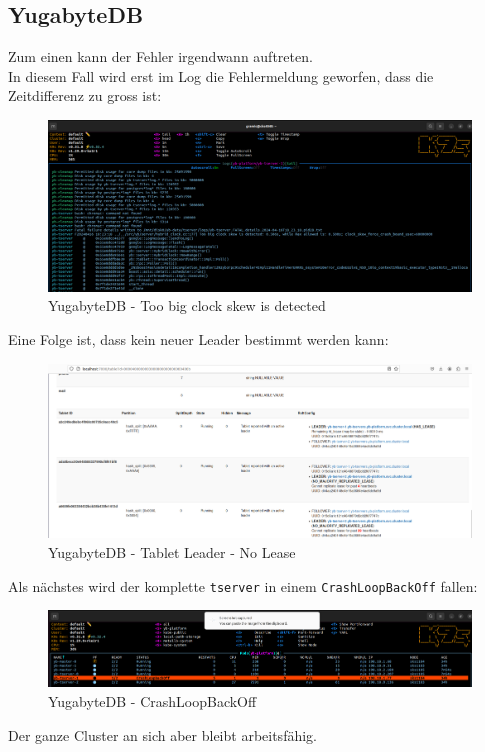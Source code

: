 
\begin{flushleft}
    \subsection{YugabyteDB}
    \label{subsec:appendix_testing_yugabytedb}
    Zum einen kann der Fehler irgendwann auftreten.\\
    In diesem Fall wird erst im Log die Fehlermeldung geworfen, dass die Zeitdifferenz zu gross ist:
    \begin{figure}[H]
        \centering
        \includegraphics[width=1\linewidth]{source/appendix/evaluation_testing/yugabytedb_too_big_clock_skew_is_detected}
        \caption{YugabyteDB - Too big clock skew is detected}
        \label{fig:yugabytedb_too_big_clock_skew_is_detected}
    \end{figure}
    Eine Folge ist, dass kein neuer Leader bestimmt werden kann:
    \begin{figure}[H]
        \centering
        \includegraphics[width=1\linewidth]{source/appendix/evaluation_testing/yugabytedb_tablet_leader_lease}
        \caption{YugabyteDB - Tablet Leader - No Lease}
        \label{fig:yugabytedb_tablet_leader_lease}
    \end{figure}
    Als nächstes wird der komplette \texttt{tserver} in einem \texttt{CrashLoopBackOff} fallen:
    \begin{figure}[H]
        \centering
        \includegraphics[width=1\linewidth]{source/appendix/evaluation_testing/yugabytedb_crashloopbackoff}
        \caption{YugabyteDB - CrashLoopBackOff}
        \label{fig:yugabytedb_crashloopbackoff}
    \end{figure}
    Der ganze Cluster an sich aber bleibt arbeitsfähig.
\end{flushleft}
